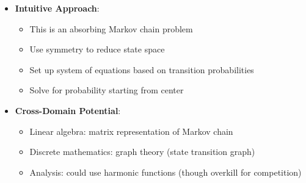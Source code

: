 \documentclass[12pt]{article}
\begin{document}
\begin{problemconfigbox}
\begin{itemize}[leftmargin=*]
    \item \textbf{Intuitive Approach}: 
    \begin{itemize}
        \item This is an absorbing Markov chain problem
        \item Use symmetry to reduce state space
        \item Set up system of equations based on transition probabilities
        \item Solve for probability starting from center
    \end{itemize}
    
    \item \textbf{Cross-Domain Potential}: 
    \begin{itemize}
        \item Linear algebra: matrix representation of Markov chain
        \item Discrete mathematics: graph theory (state transition graph)
        \item Analysis: could use harmonic functions (though overkill for competition)
    \end{itemize}
\end{itemize}
\end{problemconfigbox}
\end{document}
